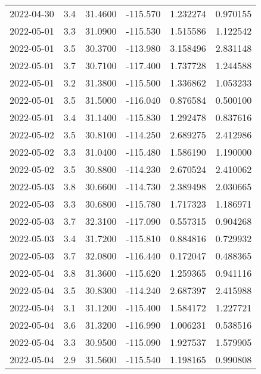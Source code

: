 \begin{tabular}{lrrrrr}
2022-04-30 &       3.4 &  31.4600 &  -115.570 &         1.232274 &         0.970155 \\
2022-05-01 &       3.3 &  31.0900 &  -115.530 &         1.515586 &         1.122542 \\
2022-05-01 &       3.5 &  30.3700 &  -113.980 &         3.158496 &         2.831148 \\
2022-05-01 &       3.7 &  30.7100 &  -117.400 &         1.737728 &         1.244588 \\
2022-05-01 &       3.2 &  31.3800 &  -115.500 &         1.336862 &         1.053233 \\
2022-05-01 &       3.5 &  31.5000 &  -116.040 &         0.876584 &         0.500100 \\
2022-05-01 &       3.4 &  31.1400 &  -115.830 &         1.292478 &         0.837616 \\
2022-05-02 &       3.5 &  30.8100 &  -114.250 &         2.689275 &         2.412986 \\
2022-05-02 &       3.3 &  31.0400 &  -115.480 &         1.586190 &         1.190000 \\
2022-05-02 &       3.5 &  30.8800 &  -114.230 &         2.670524 &         2.410062 \\
2022-05-03 &       3.8 &  30.6600 &  -114.730 &         2.389498 &         2.030665 \\
2022-05-03 &       3.3 &  30.6800 &  -115.780 &         1.717323 &         1.186971 \\
2022-05-03 &       3.7 &  32.3100 &  -117.090 &         0.557315 &         0.904268 \\
2022-05-03 &       3.4 &  31.7200 &  -115.810 &         0.884816 &         0.729932 \\
2022-05-03 &       3.7 &  32.0800 &  -116.440 &         0.172047 &         0.488365 \\
2022-05-04 &       3.8 &  31.3600 &  -115.620 &         1.259365 &         0.941116 \\
2022-05-04 &       3.5 &  30.8300 &  -114.240 &         2.687397 &         2.415988 \\
2022-05-04 &       3.1 &  31.1200 &  -115.400 &         1.584172 &         1.227721 \\
2022-05-04 &       3.6 &  31.3200 &  -116.990 &         1.006231 &         0.538516 \\
2022-05-04 &       3.3 &  30.9500 &  -115.090 &         1.927537 &         1.579905 \\
2022-05-04 &       2.9 &  31.5600 &  -115.540 &         1.198165 &         0.990808 \\

\end{tabular}
